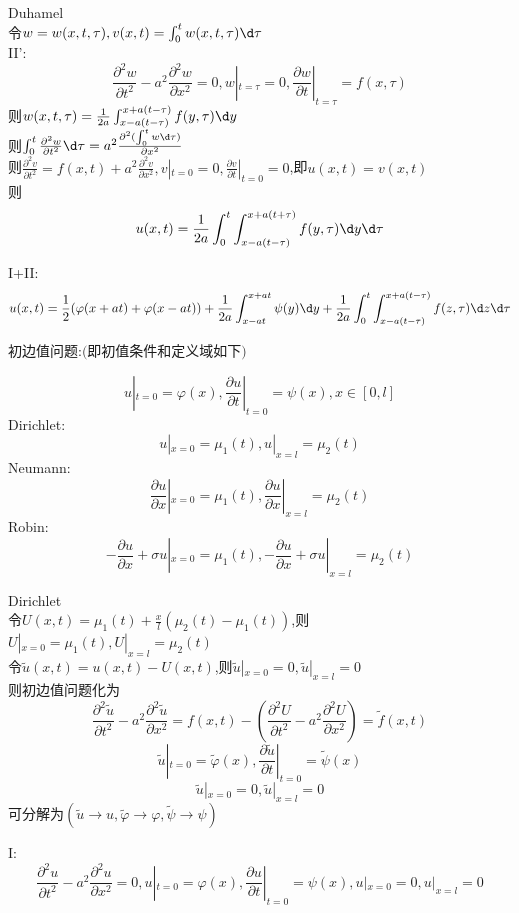 \begin{jie}Duhamel\\
令$w=w(x,t,\tau),v(x,t)=\int_{0}^{t}w(x,t,\tau)\d\tau$\\   

\rm{II}':
\[\frac{\partial^2w}{\partial t^2}-a^2\frac{\partial^2w}{\partial x^2}=0,w|_{t=\tau}=0,\frac{\partial w}{\partial t}|_{t=\tau}=f(x,\tau )\]
则$w(x,t,\tau)=\frac{1}{2a}\int_{x-a(t-\tau)}^{x+a(t-\tau)}f(y,\tau)\d y$\\
则$\int_{0}^{t}\frac{\partial^2w}{\partial t^2}\d\tau=a^2\frac{\partial^2(\int_{0}^{t}w\d\tau)}{\partial x^2}$\\
则$\frac{\partial^2 v}{\partial t^2}=f(x,t)+a^2\frac{\partial^2v}{\partial x^2},v|_{t=0}=0,\frac{\partial v}{\partial t}|_{t=0}=0$,即$u(x,t)=v(x,t)$\\
则\[u(x,t)=\frac{1}{2a}\int_{0}^{t}\int_{x-a(t-\tau)}^{x+a(t+\tau)}f(y,\tau)\d y\d\tau\]
\end{jie}

I+II:
\[u(x,t)=\frac{1}{2}(\varphi(x+at)+\varphi(x-at))+\frac{1}{2a}\int_{x-at}^{x+at}\psi(y)\d y+\frac{1}{2a}\int_{0}^{t}\int_{x-a(t-\tau)}^{x+a(t-\tau)}f(z,\tau)\d z\d\tau\]

初边值问题:$($即初值条件和定义域如下$)$

\[u|_{t=0}=\varphi(x),\frac{\partial u}{\partial t}|_{t=0}=\psi(x),x\in[0,l]\]
Dirichlet:
\[u|_{x=0}=\mu_1(t),u|_{x=l}=\mu_2(t)\] 
Neumann:
\[\frac{\partial u}{\partial x}|_{x=0}=\mu_1(t),\frac{\partial u}{\partial x}|_{x=l}=\mu_2(t)\] 
Robin:
\[-\frac{\partial u}{\partial x}+\sigma u|_{x=0}=\mu_1(t),-\frac{\partial u}{\partial x}+\sigma u|_{x=l}=\mu_2(t)\] 

Dirichlet\\
令$U(x,t)=\mu_1(t)+\frac{x}{l}(\mu_2(t)-\mu_1(t))$,则$U|_{x=0}=\mu_1(t),U|_{x=l}=\mu_2(t)$\\
令$\widetilde{u}(x,t)=u(x,t)-U(x,t)$,则$\widetilde{u}|_{x=0}=0,\widetilde{u}|_{x=l}=0$\\
则初边值问题化为\[\frac{\partial^2 \widetilde{u}}{\partial t^2}-a^2\frac{\partial^2\widetilde{u}}{\partial x^2}=f(x,t)-(\frac{\partial^2U}{\partial t^2}-a^2\frac{\partial^2U}{\partial x^2})=\widetilde{f}(x,t)\]
\[\widetilde{u}|_{t=0}=\widetilde{\varphi}(x),\frac{\partial\widetilde{u}}{\partial t}|_{t=0}=\widetilde{\psi}(x)\] 
\[\widetilde{u}|_{x=0}=0,\widetilde{u}|_{x=l}=0\]
可分解为$(\widetilde{u}\to u,\widetilde{\varphi}\to\varphi,\widetilde{\psi}\to\psi)$

I:\[\frac{\partial^2 u}{\partial t^2}-a^2\frac{\partial^2u}{\partial x^2}=0,u|_{t=0}=\varphi(x),\frac{\partial u}{\partial t}|_{t=0}=\psi(x),u|_{x=0}=0,u|_{x=l}=0\]

